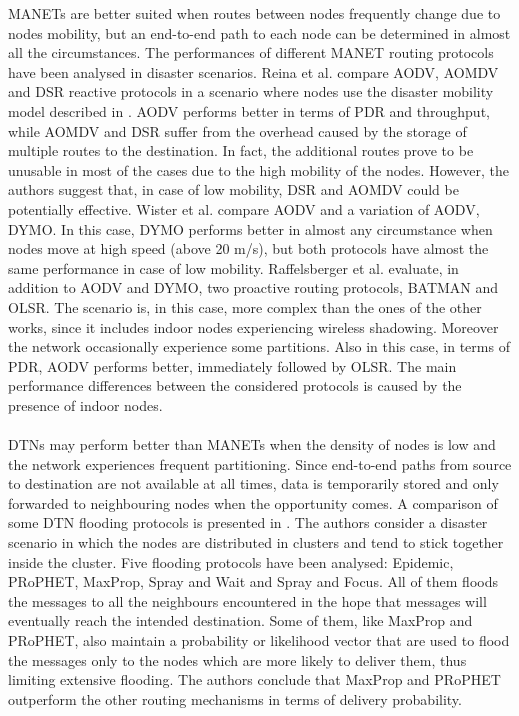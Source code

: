 \glspl{MANET} are better suited when routes between nodes frequently change due to nodes mobility, but an end-to-end path to each node can be determined in almost all the circumstances. The performances of different \gls{MANET} routing protocols have been analysed in disaster scenarios.
Reina et al. \cite{ref:soa-manet1} compare \gls{AODV}, \gls{AOMDV} and \gls{DSR} reactive protocols in a scenario where nodes use the disaster mobility model described in \cite{ref:soa-mobmodel1}. \gls{AODV} performs better in terms of \gls{PDR} and throughput, while \gls{AOMDV} and \gls{DSR} suffer from the overhead caused by the storage of multiple routes to the destination. In fact, the additional routes prove to be unusable in most of the cases due to the high mobility of the nodes. However, the authors suggest that, in case of low mobility, \gls{DSR} and \gls{AOMDV} could be potentially effective. 
Wister et al. \cite{ref:soa-manet2} compare \gls{AODV} and a variation of \gls{AODV}, DYMO. In this case, DYMO performs better in almost any circumstance when nodes move at high speed (above 20 m/s), but both protocols have almost the same performance in case of low mobility. Raffelsberger et al. \cite{ref:soa-manet3} evaluate, in addition to \gls{AODV} and DYMO, two proactive routing protocols, BATMAN and OLSR. The scenario is, in this case, more complex than the ones of the other works, since it includes indoor nodes experiencing wireless shadowing. Moreover the network occasionally experience some partitions. Also in this case, in terms of \gls{PDR}, \gls{AODV} performs better, immediately followed by OLSR. The main performance differences between the considered protocols is caused by the presence of indoor nodes. \\\\
\glspl{DTN} may perform better than \glspl{MANET} when the density of nodes is low and the network experiences frequent partitioning. Since end-to-end paths from source to destination are not available at all times, data is temporarily stored and only forwarded to neighbouring nodes when the opportunity comes. A comparison of some \gls{DTN} flooding protocols is presented in \cite{ref:soa-dtn1}. The authors consider a disaster scenario in which the nodes are distributed in clusters and tend to stick together inside the cluster. Five flooding protocols have been analysed: Epidemic, PRoPHET, MaxProp, Spray and Wait and Spray and Focus. All of them floods the messages to all the neighbours encountered in the hope that messages will eventually reach the intended destination. Some of them, like MaxProp and PRoPHET, also maintain a probability or likelihood vector that are used to flood the messages only to the nodes which are more likely to deliver them, thus limiting extensive flooding. The authors conclude that MaxProp and PRoPHET outperform the other routing mechanisms in terms of delivery probability. \\\\
